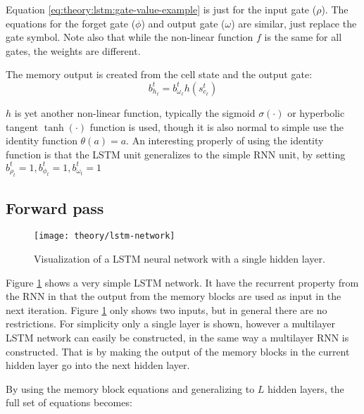 Equation \eqref{eq:theory:lstm:gate-value-example} is just for the input gate ($\rho$). The equations for the forget gate ($\phi$) and output gate ($\omega$) are similar, just replace the gate symbol. Note also that while the non-linear function $f$ is the same for all gates, the weights are different.

The memory output is created from the cell state and the output gate:
\begin{equation}
b_{h_\ell}^t = b_{\omega_\ell}^t h(s_{c_\ell}^t)
\end{equation}

$h$ is yet another non-linear function, typically the sigmoid $\sigma(\cdot)$ or hyperbolic tangent $\tanh(\cdot)$ function is used, though it is also normal to simple use the identity function $\theta(a) = a$. An interesting properly of using the identity function is that the LSTM unit generalizes to the simple RNN unit, by setting $b_{\rho_t}^t = 1, b_{\phi_t}^t = 1, b_{\omega_t}^t = 1$

\newpage
\subsection{Forward pass}

\begin{figure}[h]
	\centering
	\centerline{\texttt{[image: theory/lstm-network]}}
	\caption{Visualization of a LSTM neural network with a single hidden layer.}
	\label{fig:theory:lstm:lstm-network}
\end{figure}

Figure \ref{fig:theory:lstm:lstm-network} shows a very simple LSTM network. It have the recurrent property from the RNN in that the output from the memory blocks are used as input in the next iteration. Figure \ref{fig:theory:lstm:lstm-network} only shows two inputs, but in general there are no restrictions. For simplicity only a single layer is shown, however a multilayer LSTM network can easily be constructed, in the same way a multilayer RNN is constructed. That is by making the output of the memory blocks in the current hidden layer go into the next hidden layer. 

By using the memory block equations and generalizing to $L$ hidden layers, the full set of equations becomes:

